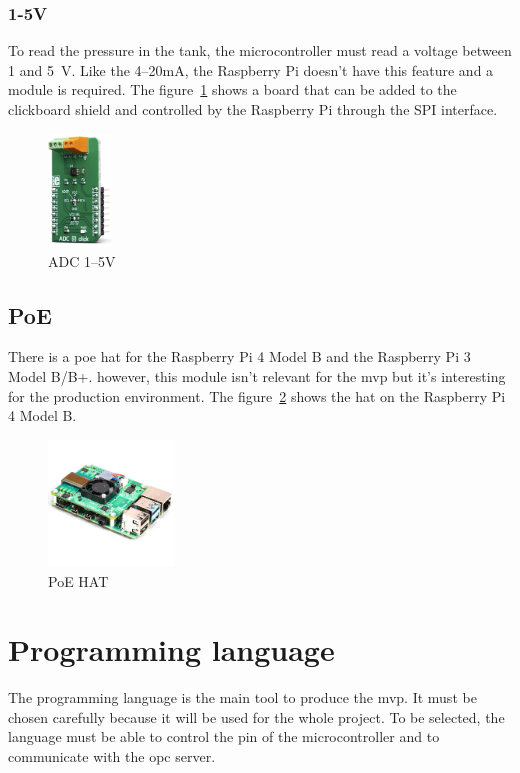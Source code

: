 \subsubsection{1-5V}
\label{subsubsec:1-5v}
To read the pressure in the tank, the microcontroller must read a voltage between 1 and 5~V\@.
Like the 4--20mA, the Raspberry Pi doesn't have this feature and a module is required.
The figure~\ref{fig:analysis:mcu:1-5V} shows a board that can be added to the clickboard shield and controlled by the Raspberry Pi through the SPI interface.

\begin{figure}[ht]
  \centering
  \includegraphics[width=0.15\textwidth]{img/raspberry-1_5V}
  \caption{ADC 1--5V~\cite{mikroe-15v}}
  \label{fig:analysis:mcu:1-5V}
\end{figure}


\subsection{PoE}
\label{subsec:poe}
There is a \acrshort{poe} hat for the Raspberry Pi 4 Model B and the Raspberry Pi 3 Model B/B+.
however, this module isn't relevant for the \acrshort{mvp} but it's interesting for the production environment.
The figure~\ref{fig:analysis:mcu:poe} shows the hat on the Raspberry Pi 4 Model B\@.

\begin{figure}[ht]
  \centering
  \includegraphics[width=0.3\textwidth]{img/raspberry-poe}
  \caption{PoE HAT~\cite{pi-shop}}
  \label{fig:analysis:mcu:poe}
\end{figure}
\section{Programming language}
\label{sec:lang}
The programming language is the main tool to produce the \acrshort{mvp}.
It must be chosen carefully because it will be used for the whole project.
To be selected, the language must be able to control the pin of the microcontroller and to communicate with the \acrshort{opc} server.

